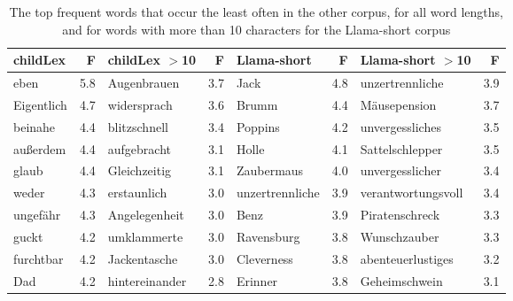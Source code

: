 \documentclass[manuscript]{stjour}
\begin{document}
\begin{table}[!htbp]
\caption{The top frequent words that occur the least often in the other corpus, for all word lengths, and for words with more than 10 characters for the Llama-short corpus}
\centering
\begin{tabular}{lrlrlrlr}
  \hline
childLex & F & childLex $>$10 & F & Llama-short & F & Llama-short $>$10 & F \\ 
  \hline
eben & 5.8 & Augenbrauen & 3.7 & Jack & 4.8 & unzertrennliche & 3.9 \\ 
  Eigentlich & 4.7 & widersprach & 3.6 & Brumm & 4.4 & Mäusepension & 3.7 \\ 
  beinahe & 4.4 & blitzschnell & 3.4 & Poppins & 4.2 & unvergessliches & 3.5 \\ 
  außerdem & 4.4 & aufgebracht & 3.1 & Holle & 4.1 & Sattelschlepper & 3.5 \\ 
  glaub & 4.4 & Gleichzeitig & 3.1 & Zaubermaus & 4.0 & unvergesslicher & 3.4 \\ 
  weder & 4.3 & erstaunlich & 3.0 & unzertrennliche & 3.9 & verantwortungsvoll & 3.4 \\ 
  ungefähr & 4.3 & Angelegenheit & 3.0 & Benz & 3.9 & Piratenschreck & 3.3 \\ 
  guckt & 4.2 & umklammerte & 3.0 & Ravensburg & 3.8 & Wunschzauber & 3.3 \\ 
  furchtbar & 4.2 & Jackentasche & 3.0 & Cleverness & 3.8 & abenteuerlustiges & 3.2 \\ 
  Dad & 4.2 & hintereinander & 2.8 & Erinner & 3.8 & Geheimschwein & 3.1 \\ 
   \hline
\end{tabular}
\label{words-llsh-low}
\end{table}
\end{document}
